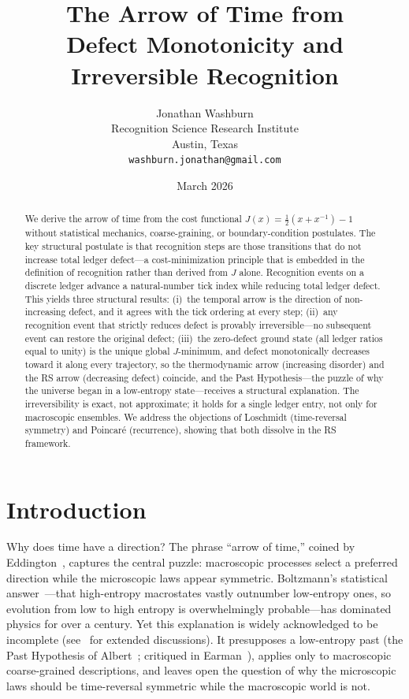 \documentclass[12pt,a4paper]{article}
\title{The Arrow of Time from\\
Defect Monotonicity and Irreversible Recognition}
\author{Jonathan Washburn\\
Recognition Science Research Institute\\
Austin, Texas\\
\texttt{washburn.jonathan@gmail.com}}
\date{March 2026}
\theoremstyle{definition}
\theoremstyle{remark}
\begin{document}
\maketitle

\begin{abstract}
We derive the arrow of time from the cost functional
$J(x) = \tfrac{1}{2}(x + x^{-1}) - 1$ without statistical mechanics,
coarse-graining, or boundary-condition postulates.
The key structural postulate is that recognition steps are those transitions
that do not increase total ledger defect---a cost-minimization principle
that is embedded in the definition of recognition rather than derived from $J$ alone.  Recognition events
on a discrete ledger advance a natural-number tick index while reducing
total ledger defect.  This yields three structural results:
(i)~the temporal arrow is the direction of non-increasing defect, and it
agrees with the tick ordering at every step;
(ii)~any recognition event that strictly reduces defect is provably
irreversible---no subsequent event can restore the original defect;
(iii)~the zero-defect ground state (all ledger ratios equal to unity) is
the unique global $J$-minimum, and defect monotonically decreases toward
it along every trajectory,
so the thermodynamic arrow (increasing disorder) and the RS arrow (decreasing
defect) coincide, and the Past Hypothesis---the puzzle of why the universe
began in a low-entropy state---receives a structural explanation.
The irreversibility is exact, not approximate; it holds for a single
ledger entry, not only for macroscopic ensembles.
We address the objections of Loschmidt (time-reversal symmetry) and
Poincar\'e (recurrence), showing that both dissolve in the RS framework.
\end{abstract}

\section{Introduction}
\label{sec:intro}

Why does time have a direction?  The phrase ``arrow of time,'' coined
by Eddington~\cite{Eddington1928}, captures the central puzzle:
macroscopic processes select a preferred direction while the microscopic
laws appear symmetric.  Boltzmann's statistical
answer~\cite{Boltzmann1896}---that high-entropy macrostates vastly
outnumber low-entropy ones, so evolution from low to high entropy is
overwhelmingly probable---has dominated physics for over a century.  Yet
this explanation is widely acknowledged to be incomplete
(see~\cite{Price1996,Zeh2007,Callender2011} for extended discussions).
It presupposes a low-entropy past (the Past Hypothesis of
Albert~\cite{Albert2000}; critiqued in Earman~\cite{Earman2006}),
applies only to macroscopic coarse-grained descriptions, and leaves open
the question of why the microscopic laws should be time-reversal
symmetric while the macroscopic world is not.
\end{document}
